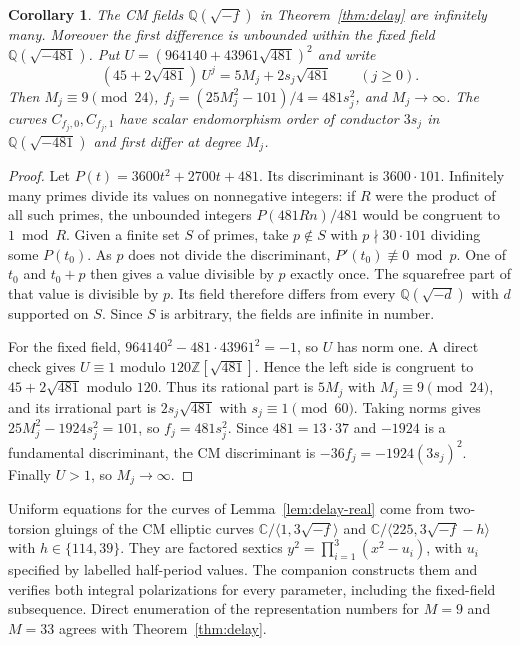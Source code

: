\documentclass[11pt,letterpaper]{amsart}
\newtheorem{corollary}[theorem]{Corollary}
\theoremstyle{definition}
\numberwithin{equation}{section}
\newcommand{\Q}{\mathbb Q}
\newcommand{\Z}{\mathbb Z}
\newcommand{\C}{\mathbb C}
\begin{document}
\begin{corollary}\label{cor:delay-fields}
The CM fields \(\Q(\sqrt{-f})\) in Theorem~\ref{thm:delay} are
infinitely many. Moreover the first difference is unbounded within the
fixed field \(\Q(\sqrt{-481})\). Put
\(U=(964140+43961\sqrt{481})^2\) and write
\[
 (45+2\sqrt{481})\,U^j=5M_j+2s_j\sqrt{481}\qquad(j\ge0).
\]
Then \(M_j\equiv9\pmod{24}\), \(f_j=(25M_j^2-101)/4=481s_j^2\), and
\(M_j\to\infty\). The curves \(C_{f_j,0},C_{f_j,1}\) have scalar endomorphism
order of conductor \(3s_j\) in \(\Q(\sqrt{-481})\) and first differ
at degree \(M_j\).
\end{corollary}

\begin{proof}
Let \(P(t)=3600t^2+2700t+481\). Its discriminant is \(3600\cdot101\).
Infinitely many primes divide its values on nonnegative integers:
if \(R\) were the product of all such primes, the unbounded integers
\(P(481Rn)/481\) would be congruent to \(1\bmod R\).
Given a finite set \(S\) of primes, take \(p\notin S\) with
\(p\nmid30\cdot101\) dividing some \(P(t_0)\). As \(p\) does not divide the discriminant,
\(P'(t_0)\not\equiv0\bmod p\). One of \(t_0\) and \(t_0+p\) then gives
a value divisible by \(p\) exactly once. The squarefree part of that
value is divisible by \(p\). Its field therefore differs from every
\(\Q(\sqrt{-d})\) with \(d\) supported on \(S\). Since \(S\) is
arbitrary, the fields are infinite in number.

For the fixed field, \(964140^2-481\cdot43961^2=-1\), so \(U\) has norm
one. A direct check gives \(U\equiv1\) modulo \(120\Z[\sqrt{481}]\).
Hence the left side is congruent to \(45+2\sqrt{481}\) modulo \(120\).
Thus its rational part is \(5M_j\) with \(M_j\equiv9\pmod{24}\), and
its irrational part is \(2s_j\sqrt{481}\) with \(s_j\equiv1\pmod{60}\).
Taking norms gives \(25M_j^2-1924s_j^2=101\), so
\(f_j=481s_j^2\). Since \(481=13\cdot37\) and \(-1924\) is a
fundamental discriminant, the CM discriminant is
\(-36f_j=-1924(3s_j)^2\). Finally \(U>1\), so \(M_j\to\infty\).
\end{proof}

Uniform equations for the curves of Lemma~\ref{lem:delay-real} come
from two-torsion gluings of the CM elliptic curves
\(\C/\langle1,3\sqrt{-f}\rangle\) and
\(\C/\langle225,3\sqrt{-f}-h\rangle\) with \(h\in\{114,39\}\). They
are factored sextics \(y^2=\prod_{i=1}^3(x^2-u_i)\), with \(u_i\)
specified by labelled half-period values. The companion constructs
them and verifies both integral polarizations for every parameter,
including the fixed-field subsequence. Direct enumeration of the
representation numbers for \(M=9\) and \(M=33\) agrees with
Theorem~\ref{thm:delay}.
\end{document}
